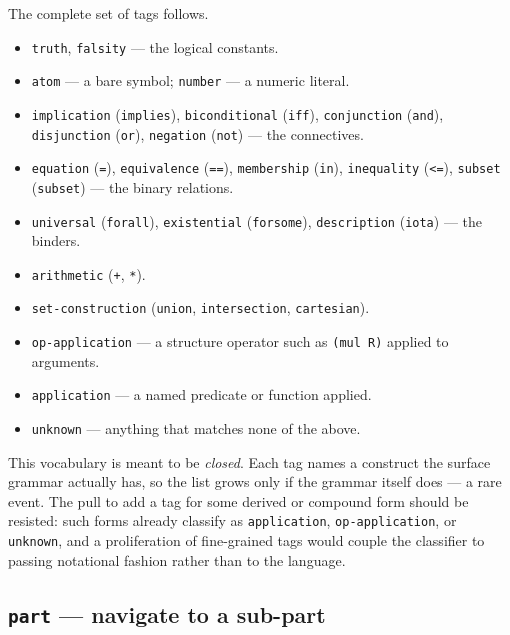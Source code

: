 \noindent
The complete set of tags follows.

\begin{itemize}
\item \texttt{truth}, \texttt{falsity} --- the logical constants.
\item \texttt{atom} --- a bare symbol; \texttt{number} --- a numeric literal.
\item \texttt{implication} (\texttt{implies}), \texttt{biconditional}
  (\texttt{iff}), \texttt{conjunction} (\texttt{and}), \texttt{disjunction}
  (\texttt{or}), \texttt{negation} (\texttt{not}) --- the connectives.
\item \texttt{equation} (\texttt{=}), \texttt{equivalence} (\texttt{==}),
  \texttt{membership} (\texttt{in}), \texttt{inequality} (\texttt{<=}),
  \texttt{subset} (\texttt{subset}) --- the binary relations.
\item \texttt{universal} (\texttt{forall}), \texttt{existential}
  (\texttt{forsome}), \texttt{description} (\texttt{iota}) --- the binders.
\item \texttt{arithmetic} (\texttt{+}, \texttt{*}).
\item \texttt{set-construction} (\texttt{union}, \texttt{intersection},
  \texttt{cartesian}).
\item \texttt{op-application} --- a structure operator such as
  \texttt{(mul R)} applied to arguments.
\item \texttt{application} --- a named predicate or function applied.
\item \texttt{unknown} --- anything that matches none of the above.
\end{itemize}

\begin{remark}
This vocabulary is meant to be \emph{closed}.  Each tag names a construct
the surface grammar actually has, so the list grows only if the grammar
itself does --- a rare event.  The pull to add a tag for some derived or
compound form should be resisted: such forms already classify as
\texttt{application}, \texttt{op-application}, or \texttt{unknown}, and a
proliferation of fine-grained tags would couple the classifier to passing
notational fashion rather than to the language.
\end{remark}

\subsection{\texttt{part} --- navigate to a sub-part}

